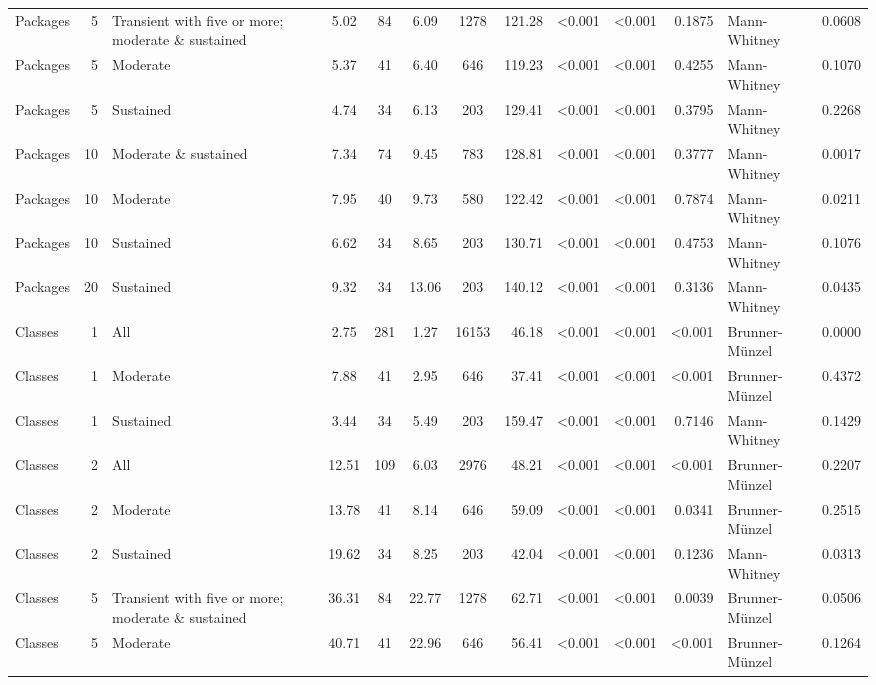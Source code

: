 \begin{table}[H]
{\begin{tabular}{l r p{4cm} c c c c r r r r l r}
Packages & 5 & Transient with five or more; moderate \& sustained &  5.02 & 84 & 6.09 & 1278 & 121.28 & \textless 0.001 & \textless 0.001 & 0.1875 &  Mann-Whitney & 0.0608 \\ 
Packages & 5 & Moderate &  5.37 & 41 & 6.40 & 646 & 119.23 & \textless 0.001 & \textless 0.001 & 0.4255 &  Mann-Whitney & 0.1070 \\ 
Packages & 5 & Sustained &  4.74 & 34 & 6.13 & 203 & 129.41 & \textless 0.001 & \textless 0.001 & 0.3795 &  Mann-Whitney & 0.2268 \\ 
Packages & 10 & Moderate \& sustained &  7.34 & 74 & 9.45 & 783 & 128.81 & \textless 0.001 & \textless 0.001 & 0.3777 &  Mann-Whitney & 0.0017 \\ 
Packages & 10 & Moderate &  7.95 & 40 & 9.73 & 580 & 122.42 & \textless 0.001 & \textless 0.001 & 0.7874 &  Mann-Whitney & 0.0211 \\ 
Packages & 10 & Sustained &  6.62 & 34 & 8.65 & 203 & 130.71 & \textless 0.001 & \textless 0.001 & 0.4753 &  Mann-Whitney & 0.1076 \\ 
Packages & 20 & Sustained &  9.32 & 34 & 13.06 & 203 & 140.12 & \textless 0.001 & \textless 0.001 & 0.3136 &  Mann-Whitney & 0.0435 \\ 
Classes & 1 & All &  2.75 & 281 & 1.27 & 16153 & 46.18 & \textless 0.001 & \textless 0.001 & \textless 0.001 &  Brunner-Münzel & 0.0000 \\ 
Classes & 1 & Moderate &  7.88 & 41 & 2.95 & 646 & 37.41 & \textless 0.001 & \textless 0.001 & \textless 0.001 &  Brunner-Münzel & 0.4372 \\ 
Classes & 1 & Sustained &  3.44 & 34 & 5.49 & 203 & 159.47 & \textless 0.001 & \textless 0.001 & 0.7146 &  Mann-Whitney & 0.1429 \\ 
Classes & 2 & All &  12.51 & 109 & 6.03 & 2976 & 48.21 & \textless 0.001 & \textless 0.001 & \textless 0.001 &  Brunner-Münzel & 0.2207 \\ 
Classes & 2 & Moderate &  13.78 & 41 & 8.14 & 646 & 59.09 & \textless 0.001 & \textless 0.001 & 0.0341 &  Brunner-Münzel & 0.2515 \\ 
Classes & 2 & Sustained &  19.62 & 34 & 8.25 & 203 & 42.04 & \textless 0.001 & \textless 0.001 & 0.1236 &  Mann-Whitney & 0.0313 \\ 
Classes & 5 & Transient with five or more; moderate \& sustained &  36.31 & 84 & 22.77 & 1278 & 62.71 & \textless 0.001 & \textless 0.001 & 0.0039 &  Brunner-Münzel & 0.0506 \\ 
Classes & 5 & Moderate &  40.71 & 41 & 22.96 & 646 & 56.41 & \textless 0.001 & \textless 0.001 & \textless 0.001 &  Brunner-Münzel & 0.1264 \\ 

\end{tabular}}
\end{table}
